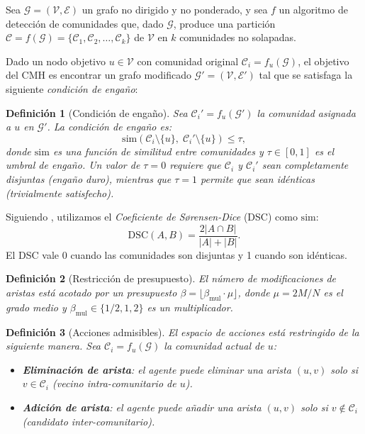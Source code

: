 \documentclass[11pt,a4paper,twoside]{tesis}
\newtheorem{definition}{Definición}[chapter]
\newcommand{\G}{\mathcal{G}}
\newcommand{\V}{\mathcal{V}}
\newcommand{\E}{\mathcal{E}}
\newcommand{\C}{\mathcal{C}}
\newcommand{\Gnew}{\mathcal{G}'}
\newcommand{\simf}{\mathrm{sim}}
\begin{document}
Sea $\G = (\V, \E)$ un grafo no dirigido y no ponderado, y sea $f$ un algoritmo de
detección de comunidades que, dado $\G$, produce una partición $\C = f(\G) =
\{\C_1, \C_2, \ldots, \C_k\}$ de $\V$ en $k$ comunidades no solapadas.

Dado un nodo objetivo $u \in \V$ con comunidad original $\C_i = f_u(\G)$, el objetivo
del CMH es encontrar un grafo modificado $\Gnew = (\V, \E')$ tal que se satisfaga la
siguiente \emph{condición de engaño}:

\begin{definition}[Condición de engaño]
\label{def:deception}
Sea $\C_i' = f_u(\Gnew)$ la comunidad asignada a $u$ en $\Gnew$. La condición de engaño es:
\[
\simf(\C_i \setminus \{u\},\; \C_i' \setminus \{u\}) \leq \tau,
\]
donde $\simf$ es una función de similitud entre comunidades y $\tau \in [0,1]$ es el
\emph{umbral de engaño}. Un valor de $\tau = 0$ requiere que $\C_i$ y $\C_i'$ sean
completamente disjuntas (engaño duro), mientras que $\tau = 1$ permite que sean
idénticas (trivialmente satisfecho).
\end{definition}

Siguiendo \textcite{bernini-2024}, utilizamos el \emph{Coeficiente de Sørensen-Dice}
(DSC) como $\simf$:
\[
\mathrm{DSC}(A, B) = \frac{2|A \cap B|}{|A| + |B|}.
\]
El DSC vale 0 cuando las comunidades son disjuntas y 1 cuando son idénticas.

\begin{definition}[Restricción de presupuesto]
\label{def:budget}
El número de modificaciones de aristas está acotado por un \emph{presupuesto}
$\beta = \lfloor \beta_{\mathrm{mul}} \cdot \mu \rfloor$, donde $\mu = 2M/N$ es el
grado medio y $\beta_{\mathrm{mul}} \in \{1/2, 1, 2\}$ es un multiplicador.
\end{definition}

\begin{definition}[Acciones admisibles]
\label{def:actions}
El espacio de acciones está restringido de la siguiente manera. Sea $\C_i = f_u(\G)$ la
comunidad actual de $u$:
\begin{itemize}
    \item \textbf{Eliminación de arista}: el agente puede eliminar una arista $(u, v)$
      solo si $v \in \C_i$ (vecino \emph{intra-comunitario} de $u$).
    \item \textbf{Adición de arista}: el agente puede añadir una arista $(u, v)$ solo
      si $v \notin \C_i$ (candidato \emph{inter-comunitario}).
\end{itemize}
\end{definition}
\end{document}
